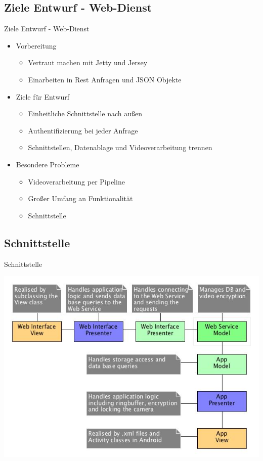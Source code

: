 \documentclass[19pt]{beamer}
\begin{document}
\subsection{Ziele Entwurf - Web-Dienst}
\begin{frame}{Ziele Entwurf - Web-Dienst}
	\begin{itemize}
		\item Vorbereitung
		\begin{itemize}
			\item Vertraut machen mit Jetty und Jersey
			\item Einarbeiten in Rest Anfragen und JSON Objekte
		\end{itemize}
		\item Ziele für Entwurf
		\begin{itemize}
			\item Einheitliche Schnittstelle nach außen
			\item Authentifizierung bei jeder Anfrage
			\item Schnittstellen, Datenablage und Videoverarbeitung trennen
		\end{itemize}
		\item Besondere Probleme
		\begin{itemize}
			\item Videoverarbeitung per Pipeline
			\item Großer Umfang an Funktionalität
			\item Schnittstelle
		\end{itemize}
	\end{itemize}
\end{frame}
\subsection{Schnittstelle}
\begin{frame}{Schnittstelle}
\begin{center}
\includegraphics[scale=0.3]{resources/overview_mvp.jpg}
\end{center}
\end{frame}
\end{document}
